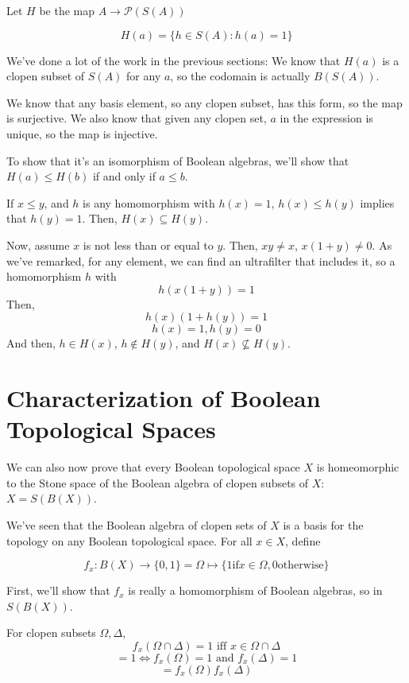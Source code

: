 \documentclass{article}
\begin{document}
      Let $H$ be the map $A \rightarrow \mathcal{P}(S(A))$

      \[H(a) = \{h \in S(A) : h(a) = 1\}\]

      We've done a lot of the work in the previous sections: We know that $H(a)$
      is a clopen subset of $S(A)$ for any $a$, so the codomain is actually
      $B(S(A))$.

      We know that any basis element, so any clopen subset, has this form, so
      the map is surjective.  We also know that given any clopen set, $a$ in the
      expression is unique, so the map is injective.

      To show that it's an isomorphism of Boolean algebras, we'll show that
      $H(a) \leq H(b)$ if and only if $a \leq b$.

      If $x \leq y$, and $h$ is any homomorphism with $h(x) = 1$, $h(x) \leq
      h(y)$ implies that $h(y) = 1$. Then, $H(x) \subseteq H(y)$.

      Now, assume $x$ is not less than or equal to $y$. Then, $xy \neq x$,
      $x(1+y) \neq 0$.
      As we've remarked, for any element, we can find an ultrafilter that
      includes it, so a homomorphism $h$ with
      \[h(x(1+y)) = 1\]
      Then,
      \[h(x)(1+h(y)) = 1\]
      \[h(x) = 1, h(y) = 0\]
      And then, $h \in H(x)$, $h \notin  H(y)$, and $H(x) \nsubseteq H(y)$.

    \section{Characterization of Boolean Topological Spaces}

      We can also now prove that every Boolean topological space $X$ is
      homeomorphic to the Stone space of the Boolean algebra of clopen subsets of
      $X$: $X = S(B(X))$.

      We've seen that the Boolean algebra of clopen sets of $X$ is a basis for
      the topology on any Boolean topological space. For all $x \in X$, define

      \[f_x: B(X) \rightarrow \{0,1\} = \Omega \mapsto \{1 \text {if} x \in
      \Omega, 0 \text {otherwise}\}\]

      First, we'll show that $f_x$ is really a homomorphism of Boolean algebras,
      so in $S(B(X))$. 

      For clopen subsets $\Omega, \Delta$,
      \[f_x(\Omega \cap \Delta) = 1 \text{ iff } x \in \Omega \cap \Delta\]
      \[= 1 \iff f_x(\Omega) = 1 \text{ and } f_x(\Delta) = 1\]
      \[= f_x(\Omega)f_x(\Delta)\]
\end{document}
